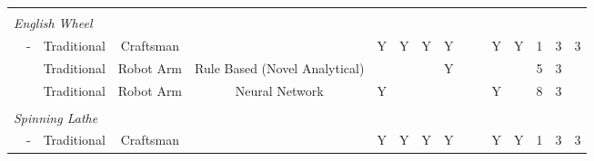 \begin{tabular}{lccccccccccccccc}
 &                                                                                                                 &             &                 &                                   &             &            &           &           &               &            &              &           &     &             &          \\
\multicolumn{16}{l}{\textit{English Wheel}}                                                                                                                                                                                                                                                                                               \\
 & -                                                                                                       & Traditional & Craftsman       &                                   & Y           & Y          & Y         & Y         &               &            & Y            & Y         & 1   & 3           & 3        \\
 & \citep{Vazquez2017RoboticWheeling}                                                                              & Traditional & Robot Arm       & Rule Based (Novel Analytical)     &             &            &           & Y         &               &            &              &           & 5   & 3           &          \\
 & \citep{Rossi2018ModellingWheel, Rossi2018Re/LearningSurfaces}                                                   & Traditional & Robot Arm       & Neural Network                    & Y           &            &           &           &               &            & Y            &           & 8   & 3           &          \\
 &                                                                                                                 &             &                 &                                   &             &            &           &           &               &            &              &           &     &             &          \\
\multicolumn{16}{l}{\textit{Spinning Lathe}}                                                                                                                                                                                                                                                                                              \\
 & -                                                                                                       & Traditional & Craftsman       &                                   & Y           & Y          & Y         & Y         &               &            & Y            & Y         & 1   & 3           & 3        \\

\end{tabular}
